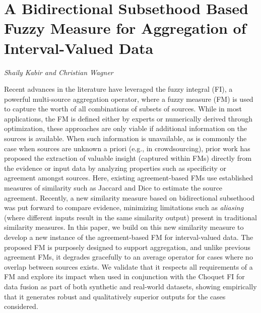 \documentclass[../booklet.tex]{subfiles}
\begin{document}
\section[A Bidirectional Subsethood Based Fuzzy Measure for Aggregation of Interval-Valued Data. {\it Shaily Kabir and Christian Wagner}]{A Bidirectional Subsethood Based Fuzzy Measure for Aggregation of Interval-Valued Data}
 

\begin{center}
  {\it Shaily Kabir and Christian Wagner}
\end{center}

\vskip 0.8cm


Recent advances in the literature have leveraged the fuzzy integral (FI), a powerful multi-source aggregation operator,  where a fuzzy measure (FM) is used to capture the worth of all combinations of subsets of sources. While in most applications, the FM is defined either by experts or numerically derived through optimization, these approaches are only viable if additional information on the sources is available. When such information is unavailable, as is commonly the case when sources are unknown a priori (e.g., in crowdsourcing), prior work has proposed the extraction of valuable insight (captured within FMs) directly from the evidence or input data by analyzing properties such as specificity or agreement amongst sources. Here, existing agreement-based FMs use established measures of similarity such as Jaccard and Dice to estimate the source agreement. Recently, a new similarity measure based on bidirectional subsethood was put forward to compare evidence, minimizing limitations such as \emph{aliasing} (where different inputs result in the same similarity output) present in traditional similarity measures. In this paper, we build on this new similarity measure to develop a new instance of the agreement-based FM for interval-valued data. The proposed FM is purposely designed to support aggregation, and unlike previous agreement FMs, it degrades gracefully to an average operator for cases where no overlap between sources exists. We validate that it respects all requirements of a FM and explore its impact when used in conjunction with the Choquet FI for data fusion as part of both synthetic and real-world datasets, showing empirically that it generates robust and qualitatively superior outputs for the cases considered.

\end{document}
